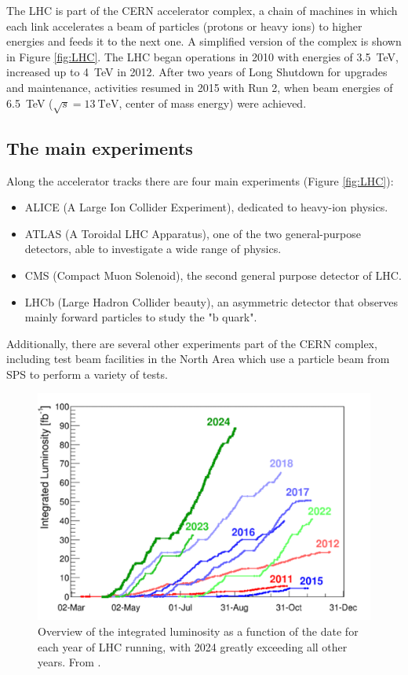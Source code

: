 The LHC is part of the CERN accelerator complex, a chain of machines in which each link accelerates a beam of particles (protons or heavy ions) to higher energies and feeds it to the next one. A simplified version of the complex is shown in Figure \ref{fig:LHC}. The LHC began operations in 2010 with energies of \qty{3.5}{\tera\electronvolt}, increased up to \qty{4}{\tera\electronvolt} in 2012. After two years of Long Shutdown for upgrades and maintenance, activities resumed in 2015 with Run 2, when beam energies of \qty{6.5}{\tera\electronvolt} ($\sqrt{s}=\qty{13}{\tera\electronvolt}$, center of mass energy) were achieved.


\subsection{The main experiments}

Along the accelerator tracks there are four main experiments (Figure \ref{fig:LHC}):
\begin{itemize}
    \item ALICE (A Large Ion Collider Experiment), dedicated to heavy-ion physics\cite{homeALICE}.
    \item ATLAS (A Toroidal LHC Apparatus), one of the two general-purpose detectors, able to investigate a wide range of physics.
    \item CMS (Compact Muon Solenoid), the second general purpose detector of LHC.
    \item LHCb (Large Hadron Collider beauty), an asymmetric detector that observes mainly forward particles to study the "b quark".
\end{itemize}

Additionally, there are several other experiments part of the CERN complex, including test beam facilities in the North Area which use a particle beam from SPS to perform a variety of tests.

\begin{figure}[!ht]
    \centering
    \includegraphics[width=.6\linewidth]{Images/intro/integrated_luminosity.png}
    \captionsetup{width=.8\linewidth}
    \caption{Overview of the integrated luminosity as a function of the date for each year of LHC running, with 2024 greatly exceeding all other years. From \cite{homeAcceleratorReport}.}
    \label{fig:integrated_luminosity}
\end{figure}

